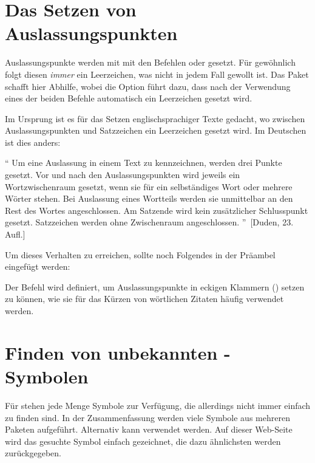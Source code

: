 \section{Das Setzen von Auslassungspunkten}
%
%
%
Auslassungspunkte werden mit  mit den Befehlen  oder 
 gesetzt. Für gewöhnlich folgt diesen \emph{immer} ein 
Leerzeichen, was nicht in jedem Fall gewollt ist. Das Paket  
schafft hier Abhilfe, wobei die Option  führt dazu, dass nach 
der Verwendung eines der beiden Befehle automatisch ein Leerzeichen gesetzt 
wird. 
%
\begin{quoting}
\begin{Code}
\usepackage[xspace]{ellipsis}
\end{Code}
\end{quoting}
%
Im Ursprung ist es für das Setzen englischsprachiger Texte gedacht, wo zwischen 
Auslassungspunkten und Satzzeichen ein Leerzeichen gesetzt wird. Im Deutschen 
ist dies anders:
%
\begin{quoting}
\enquote{%
  Um eine Auslassung in einem Text zu kennzeichnen, werden drei Punkte gesetzt. 
  Vor und nach den Auslassungspunkten wird jeweils ein Wortzwischenraum 
  gesetzt, wenn sie für ein selbständiges Wort oder mehrere Wörter stehen. Bei 
  Auslassung eines Wortteils werden sie unmittelbar an den Rest des Wortes 
  angeschlossen. Am Satzende wird kein zusätzlicher Schlusspunkt gesetzt. 
  Satzzeichen werden ohne Zwischenraum angeschlossen.%
}~[Duden, 23. Aufl.]
\end{quoting} 
%
Um dieses Verhalten zu erreichen, sollte noch Folgendes in der Präambel 
eingefügt werden:
%
\begin{quoting}
\begin{Code}
\let\ellipsispunctuation\relax
\newcommand*{\qdots}{[\dots{}]\xspace}
\end{Code}
\end{quoting}
%
Der Befehl  wird definiert, um Auslassungspunkte in eckigen 
Klammern (\POParameter{\dots}) setzen zu können, wie sie für das Kürzen von 
wörtlichen Zitaten häufig verwendet werden.



\section{Finden von unbekannten -Symbolen}
%
%
Für  stehen jede Menge Symbole zur Verfügung, die allerdings 
nicht immer einfach zu finden sind. In der Zusammenfassung
%
{} werden viele Symbole aus mehreren Paketen aufgeführt. 
Alternativ kann  
verwendet werden. Auf dieser Web-Seite wird das gesuchte Symbol einfach 
gezeichnet, die dazu ähnlichsten werden zurückgegeben.



